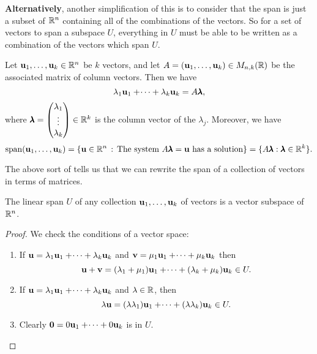\documentclass[10pt, a4paper]{article}
\begin{document}
\textbf{Alternatively},
another simplification of this is to consider that the span is just a subset of $\mathbb{R} ^ n$ containing all of the combinations of the vectors.
So for a set of vectors to span a subspace $U$,
everything in $U$ must be able to be written as a combination of the vectors which span $U$.
\medskip

\begin{proposition}\label{pre:linalg:prop:spanissolutionset}
    Let $\mathbf{u}_1, \dotsc, \mathbf{u}_k \in \mathbb{R} ^ n$ be $k$ vectors,
    and let $A = (\mathbf{u}_1, \dotsc, \mathbf{u}_k) \in M_{n, k}(\mathbb{R})$ be the associated matrix of column vectors.
    Then we have
    \[
    \lambda_1\mathbf{u}_1 + \dotsi + \lambda_k\mathbf{u}_k = A\pmb{\lambda},
    \]
    where $\pmb{\lambda} = \begin{pmatrix}
        \lambda_1 \\ \vdots \\ \lambda_k
    \end{pmatrix} \in \mathbb{R} ^ k$ is the column vector of the $\lambda_j$.
    Moreover,
    we have
    \[
    \mathrm{span}(\mathbf{u}_1, \dotsc, \mathbf{u}_k) = \{\mathbf{u} \in \mathbb{R} ^ n\,:\,\text{The system } A\pmb{\lambda} = \mathbf{u}\text{ has a solution}\} = \{A\pmb{\lambda}:\pmb{\lambda} \in \mathbb{R} ^ k\}.
    \]
\end{proposition}
The above sort of tells us that we can rewrite the span of a collection of vectors in terms of matrices.

\begin{lemma}
    The linear span $U$ of any collection $\mathbf{u}_1, \dotsc, \mathbf{u}_k$ of vectors is a vector subspace of $\mathbb{R} ^ n$.
    \begin{proof}
        We check the conditions of a vector space:
        \begin{enumerate}[label = (\roman*)]
            \item If $\mathbf{u} = \lambda_1\mathbf{u}_1 + \dotsi + \lambda_k\mathbf{u}_k$ and $\mathbf{v} = \mu_1\mathbf{u}_1 + \dotsi + \mu_k\mathbf{u}_k$ then
            \[
            \mathbf{u} + \mathbf{v} = (\lambda_1 + \mu_1)\mathbf{u}_1 + \dotsi + (\lambda_k + \mu_k)\mathbf{u}_k \in U.
            \]
            \item If $\mathbf{u} = \lambda_1\mathbf{u}_1 + \dotsi + \lambda_k\mathbf{u}_k$ and $\lambda \in \mathbb{R}$,
            then
            \[
            \lambda\mathbf{u} = (\lambda\lambda_1)\mathbf{u}_1 + \dotsi + (\lambda\lambda_k)\mathbf{u}_k \in U.
            \]
            \item Clearly $\mathbf{0} = 0\mathbf{u}_1 + \dotsi + 0\mathbf{u}_k$ is in $U$.
        \end{enumerate}
    \end{proof}
\end{lemma}
\end{document}
